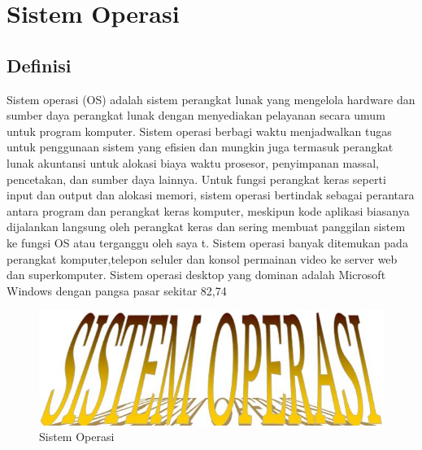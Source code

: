 \section{Sistem Operasi}
	\subsection{Definisi}
		\begin{enumerate}
			Sistem operasi (OS) adalah sistem perangkat lunak yang mengelola hardware dan sumber daya perangkat lunak dengan menyediakan pelayanan secara umum untuk program komputer.
			Sistem operasi berbagi waktu menjadwalkan tugas untuk penggunaan sistem yang efisien dan mungkin juga termasuk perangkat lunak akuntansi untuk alokasi biaya waktu prosesor, penyimpanan massal, pencetakan, dan sumber daya lainnya.
			Untuk fungsi perangkat keras seperti input dan output dan alokasi memori, sistem operasi bertindak sebagai perantara antara program dan perangkat keras komputer, meskipun kode aplikasi biasanya dijalankan langsung oleh perangkat keras dan sering membuat panggilan sistem ke fungsi OS atau terganggu oleh saya t. Sistem operasi banyak ditemukan pada perangkat komputer,telepon seluler dan konsol permainan video ke server web dan superkomputer.
			Sistem operasi desktop yang dominan adalah Microsoft Windows dengan pangsa pasar sekitar 82,74%
		\end{enumerate}
	\begin{figure}[ht]
		\centerline{\includegraphics[width=1\textwidth]{figures/OS.JPG}}
		\caption{Sistem Operasi}
		\label{OS}
	\end{figure}


